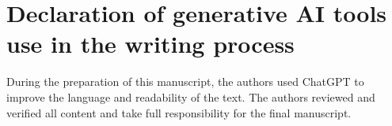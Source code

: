 \documentclass[a4paper,fleqn]{cas-sc}
\begin{document}
\section*{Declaration of generative AI tools use in the writing process}
During the preparation of this manuscript, the authors used ChatGPT to improve the language and readability of the text. The authors reviewed and verified all content and take full responsibility for the final manuscript.





\end{document}
